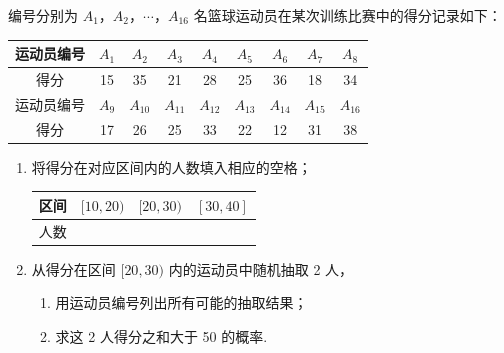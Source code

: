 \begin{problem}
编号分别为 \(A_{1}\)，\(A_{2}\)，\(\cdots\)，\(A_{16}\) 名篮球运动员在某次训练比赛中的得分记录如下：

\begin{center}
\begin{tabular}{|c|c|c|c|c|c|c|c|c|}
\hline
运动员编号 & \(A_{1}\) & \(A_{2}\) & \(A_{3}\) & \(A_{4}\) & \(A_{5}\) & \(A_{6}\) & \(A_{7}\) & \(A_{8}\) \\
\hline
得分 & 15 & 35 & 21 & 28 & 25 & 36 & 18 & 34 \\
\hline
运动员编号 & \(A_{9}\) & \(A_{10}\) & \(A_{11}\) & \(A_{12}\) & \(A_{13}\) & \(A_{14}\) & \(A_{15}\) & \(A_{16}\) \\
\hline
得分 & 17 & 26 & 25 & 33 & 22 & 12 & 31 & 38 \\
\hline
\end{tabular}
\end{center}

\begin{enumerate}
    \item 将得分在对应区间内的人数填入相应的空格；
    \begin{center}
    \begin{tabular}{|c|c|c|c|}
    \hline
    区间 & \([10,20)\) & \([20,30)\) & \([30,40]\) \\
    \hline
    人数 &\fillinblank{}&\fillinblank{}&\fillinblank{} \\
    \hline
    \end{tabular}
    \end{center}
    \item 从得分在区间 \([20, 30)\) 内的运动员中随机抽取 2 人，
    \begin{enumerate}
    \item 用运动员编号列出所有可能的抽取结果；
    \item 求这 2 人得分之和大于 50 的概率.
    \end{enumerate}
\end{enumerate}
\end{problem}

